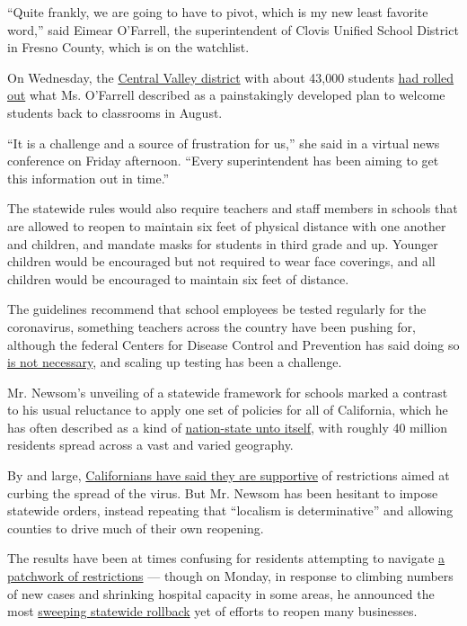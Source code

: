 ``Quite frankly, we are going to have to pivot, which is my new least
favorite word,'' said Eimear O'Farrell, the superintendent of Clovis
Unified School District in Fresno County, which is on the watchlist.

On Wednesday, the
\href{https://www.cusd.com/CUSDAt-A-Glance.aspx}{Central Valley
district} with about 43,000 students
\href{https://www.fresnobee.com/news/coronavirus/article244300057.html}{had
rolled out} what Ms. O'Farrell described as a painstakingly developed
plan to welcome students back to classrooms in August.

``It is a challenge and a source of frustration for us,'' she said in a
virtual news conference on Friday afternoon. ``Every superintendent has
been aiming to get this information out in time.''

The statewide rules would also require teachers and staff members in
schools that are allowed to reopen to maintain six feet of physical
distance with one another and children, and mandate masks for students
in third grade and up. Younger children would be encouraged but not
required to wear face coverings, and all children would be encouraged to
maintain six feet of distance.

The guidelines recommend that school employees be tested regularly for
the coronavirus, something teachers across the country have been pushing
for, although the federal Centers for Disease Control and Prevention has
said doing so
\href{https://www.cdc.gov/coronavirus/2019-ncov/community/schools-childcare/k-12-testing.html}{is
not necessary}, and scaling up testing has been a challenge.

Mr. Newsom's unveiling of a statewide framework for schools marked a
contrast to his usual reluctance to apply one set of policies for all of
California, which he has often described as a kind of
\href{https://www.nytimes.com/2020/04/14/us/california-coronavirus-newsom-nation-state.html}{nation-state
unto itself}, with roughly 40 million residents spread across a vast and
varied geography.

By and large,
\href{https://www.nytimes.com/2020/06/04/us/california-newsom-coronavirus.html}{Californians
have said they are supportive} of restrictions aimed at curbing the
spread of the virus. But Mr. Newsom has been hesitant to impose
statewide orders, instead repeating that ``localism is determinative''
and allowing counties to drive much of their own reopening.

The results have been at times confusing for residents attempting to
navigate
\href{https://www.nytimes.com/article/coronavirus-california-reopening-phases.html}{a
patchwork of restrictions} --- though on Monday, in response to climbing
numbers of new cases and shrinking hospital capacity in some areas, he
announced the most
\href{https://www.nytimes.com/2020/07/14/us/california-counties-reopening.html}{sweeping
statewide rollback} yet of efforts to reopen many businesses.

